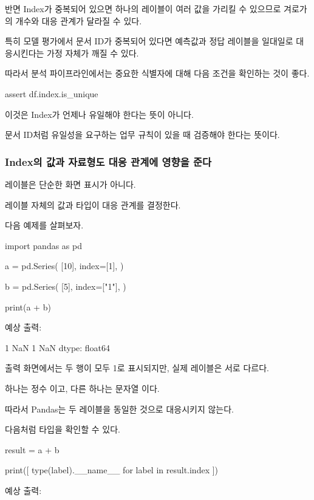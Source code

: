 반면 Index가 중복되어 있으면 하나의 레이블이 여러 값을 가리킬 수 있으므로 겨로가의 개수와 대응 관계가 달라질 수 있다.

특히 모델 평가에서 문서 ID가 중복되어 있다면 예측값과 정답 레이블을 일대일로 대응시킨다는 가정 자체가 깨질 수 있다.

따라서 분석 파이프라인에서는 중요한 식별자에 대해 다음 조건을 확인하는 것이 좋다.

\begin{dhkcode}
assert df.index.is_unique
\end{dhkcode}

이것은 Index가 언제나 유일해야 한다는 뜻이 아니다.

문서 ID처럼 유일성을 요구하는 업무 규칙이 있을 때 검증해야 한다는 뜻이다.

\subsubsection{Index의 값과 자료형도 대응 관계에 영향을 준다}

레이블은 단순한 화면 표시가 아니다.

레이블 자체의 값과 타입이 대응 관계를 결정한다.

다음 예제를 살펴보자.

\begin{dhkcode}
import pandas as pd

a = pd.Series(
    [10],
    index=[1],
)

b = pd.Series(
    [5],
    index=["1"],
)

print(a + b)
\end{dhkcode}

예상 출력:

\begin{dhkzsh}
1   NaN
1   NaN
dtype: float64
\end{dhkzsh}

출력 화면에서는 두 행이 모두 1로 표시되지만, 실제 레이블은 서로 다르다.

하나는 정수 이고, 다른 하나는 문자열 이다.

따라서 Pandas는 두 레이블을 동일한 것으로 대응시키지 않는다.

다음처럼 타입을 확인할 수 있다.

\begin{dhkcode}
result = a + b

print([
    type(label).__name__ for label in result.index
])
\end{dhkcode}

예상 출력:

